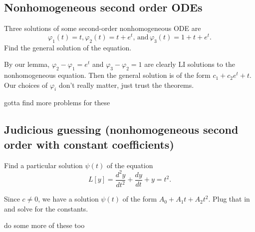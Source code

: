 \subsection{Nonhomogeneous second order ODEs}
\begin{prob}
    Three solutions of some second-order nonhomogeneous ODE are \[
        \varphi_1 (t)=t, \varphi_2(t)=t+e^{t},\,\text{and}\, \varphi_3(t)=1+t+e^{t}.  
    \] Find the general solution of the equation.
\end{prob}
\begin{solution}
    By our lemma, $\varphi_2-\varphi_1=e^{t}  $ and $\varphi_3-\varphi_2=1  $ are clearly LI solutions to the nonhomogeneous equation. Then the general solution is of the form $c_1+c_2e^{t}+t$. Our choices of $\varphi_i $ don't really matter, just trust the theorems.
\end{solution}
\begin{prob}
    gotta find more problems for these
\end{prob}
\subsection{Judicious guessing (nonhomogeneous second order with constant coefficients)}
\begin{prob}
    Find a particular solution $\psi(t)$ of the equation \[
        L[y]=\frac{d^2y}{dt^2}+\frac{dy}{dt}+y=t^2.
    \] 
\end{prob}
\begin{solution}
    Since $c\neq 0$, we have a solution $\psi(t)$ of the form $A_0+A_1t+A_2t^2$. Plug that in and solve for the constants.
\end{solution}
\begin{prob}
    do some more of these too
\end{prob}






